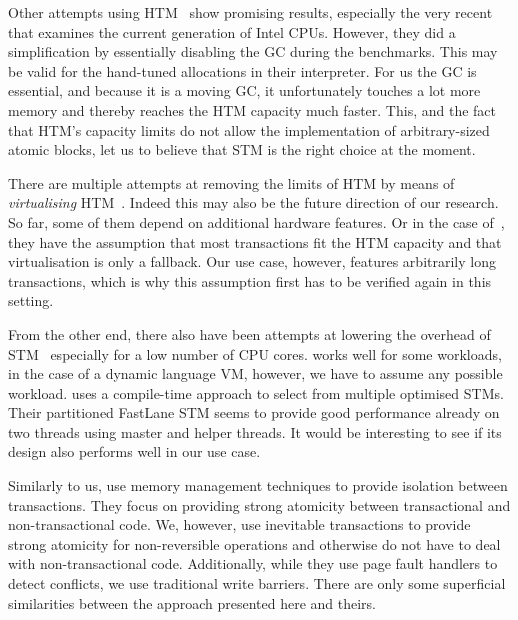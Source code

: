\documentclass{sigplanconf}
\begin{document}
Other attempts using HTM~\cite{nicholas06,odaira14,fuad10} show
promising results, especially the very recent~\cite{odaira14} that
examines the current generation of Intel CPUs. However, they did a
simplification by essentially disabling the GC during the
benchmarks. This may be valid for the hand-tuned allocations in their
interpreter. For us the GC is essential, and because it is a moving
GC, it unfortunately touches a lot more memory and thereby reaches the
HTM capacity much faster.  This, and the fact that HTM's capacity
limits do not allow the implementation of arbitrary-sized atomic blocks, let
us to believe that STM is the right choice at the moment.

There are multiple attempts at removing the limits of HTM by means of
\emph{virtualising} HTM~\cite{rajwar05,chung06}. Indeed this may also
be the future direction of our research. So far, some of them depend
on additional hardware features. Or in the case of~\cite{chung06},
they have the assumption that most transactions fit the HTM capacity
and that virtualisation is only a fallback. Our use case, however,
features arbitrarily long transactions, which is why this assumption
first has to be verified again in this setting.

From the other end, there also have been attempts at lowering the
overhead of STM~\cite{warmhoff13,spear09} especially for a low number
of CPU cores. \cite{spear09} works well for some workloads, in the
case of a dynamic language VM, however, we have to assume any possible
workload.  \cite{warmhoff13} uses a compile-time approach to select
from multiple optimised STMs. Their partitioned FastLane STM seems to
provide good performance already on two threads using master and
helper threads. It would be interesting to see if its design also
performs well in our use case.

Similarly to us, \cite{martin09} use memory management techniques to
provide isolation between transactions. They focus on providing strong
atomicity between transactional and non-transactional code.  We,
however, use inevitable transactions to provide strong atomicity
for non-reversible operations and otherwise do not have to deal
with non-transactional code.  Additionally, while they use page fault
handlers to detect conflicts, we use traditional write barriers. There
are only some superficial similarities between the approach presented
here and theirs.


\end{document}
